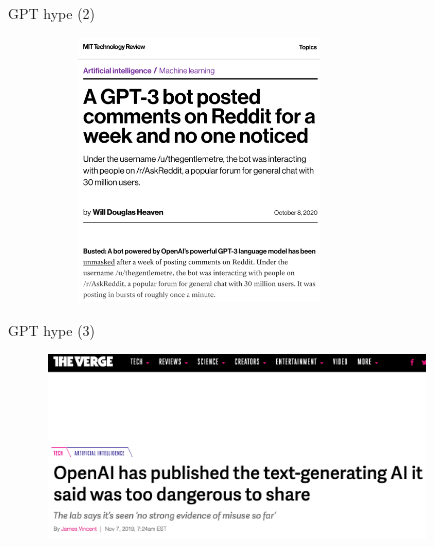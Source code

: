 
\begin{vbframe}{GPT hype (2)}

\vfill

	\begin{figure}
		\centering
		\includegraphics[height=7cm,width=8cm]{figure/mittechnologyreview.png}
	\end{figure}
	
\vfill

\end{vbframe}




\begin{vbframe}{GPT hype (3)}

\vfill

	\begin{figure}
		\centering
		\includegraphics[width=10cm]{figure/gpt2todangerous.png}
	\end{figure}

\vfill

\end{vbframe}




